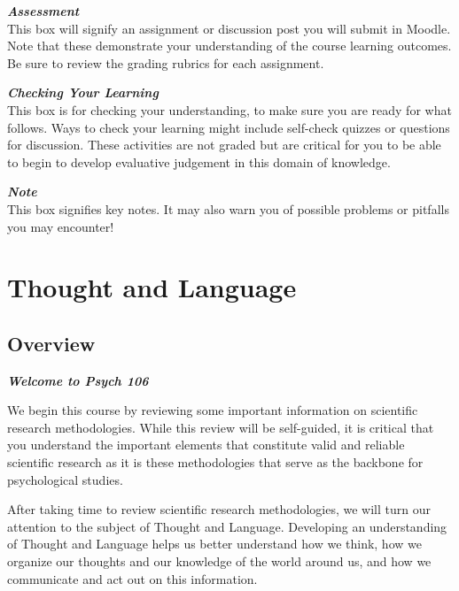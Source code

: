 \documentclass[
]{book}
\begin{document}
\begin{assessment}
\textbf{\emph{Assessment}}\\
This box will signify an assignment or discussion post you will submit in Moodle. Note that these demonstrate your understanding of the course learning outcomes. Be sure to review the grading rubrics for each assignment.
\end{assessment}

\begin{progress}
\textbf{\emph{Checking Your Learning}}\\
This box is for checking your understanding, to make sure you are ready for what follows. Ways to check your learning might include self-check quizzes or questions for discussion. These activities are not graded but are critical for you to be able to begin to develop evaluative judgement in this domain of knowledge.
\end{progress}

\begin{caution}
\textbf{\emph{Note}}\\
This box signifies key notes. It may also warn you of possible problems or pitfalls you may encounter!
\end{caution}

\hypertarget{thought-and-language}{%
\chapter{Thought and Language}\label{thought-and-language}}

\hypertarget{overview}{%
\section*{Overview}\label{overview}}

\textbf{\emph{Welcome to Psych 106}}

We begin this course by reviewing some important information on scientific research methodologies. While this review will be self-guided, it is critical that you understand the important elements that constitute valid and reliable scientific research as it is these methodologies that serve as the backbone for psychological studies.

After taking time to review scientific research methodologies, we will turn our attention to the subject of Thought and Language. Developing an understanding of Thought and Language helps us better understand how we think, how we organize our thoughts and our knowledge of the world around us, and how we communicate and act out on this information.
\end{document}
